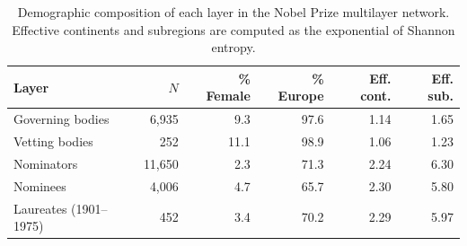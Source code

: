\begin{table}[ht]
\centering
\caption{Demographic composition of each layer in the Nobel Prize multilayer network. Effective continents and subregions are computed as the exponential of Shannon entropy.}
\label{tab:layer_composition}
\small
\begin{tabular}{lrrrrr}
\toprule
Layer & $N$ & \% Female & \% Europe & Eff. cont. & Eff. sub. \\
\midrule
Governing bodies & 6,935 & 9.3 & 97.6 & 1.14 & 1.65 \\
Vetting bodies & 252 & 11.1 & 98.9 & 1.06 & 1.23 \\
Nominators & 11,650 & 2.3 & 71.3 & 2.24 & 6.30 \\
Nominees & 4,006 & 4.7 & 65.7 & 2.30 & 5.80 \\
Laureates (1901--1975) & 452 & 3.4 & 70.2 & 2.29 & 5.97 \\
\bottomrule
\end{tabular}
\end{table}
